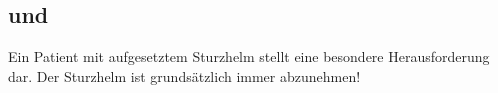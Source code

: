 
\subsection{ und }
\label{topic:helmabnahme}
\label{topic:hws-stabilisierung-manuell}


\Text{\TxBeschreibung}
{Ein Patient mit aufgesetztem Sturzhelm stellt eine 
besondere Herausforderung dar. 
%
Der Sturzhelm ist grundsätzlich immer abzunehmen!
}{}{}{}{}

